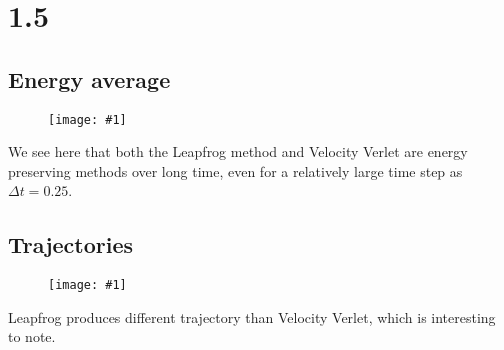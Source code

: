 \documentclass[11pt]{article}
\newcommand{\singlefigure}[1]{
\begin{figure}[H]
  \centering
  \begin{minipage}{0.4\textwidth}
    \centering
    \texttt{[image: \#1]}
  \end{minipage}
\end{figure}
}
\begin{document}
\section*{1.5}
\begin{multicols}{2}
  \subsection*{Energy average}
  \singlefigure{./plots/1_5/study.png}
  We see here that both the Leapfrog method and Velocity Verlet are energy preserving methods over long time, even for a relatively large time step as $\Delta t = 0.25$.
  \columnbreak
  \subsection*{Trajectories}
  \singlefigure{./plots/1_5/study2.png}
  Leapfrog produces different trajectory than Velocity Verlet, which is interesting to note.
\end{multicols}

\end{document}
